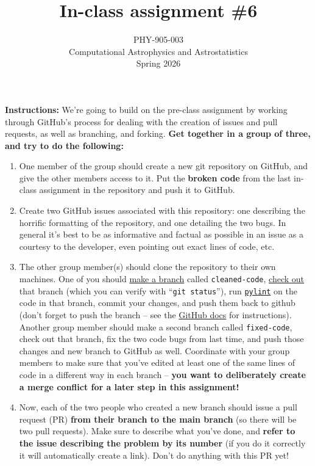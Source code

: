 \documentclass[10pt]{article}
\title{In-class assignment \#6}
\author{PHY-905-003\\Computational Astrophysics and
  Astrostatistics\\Spring 2026}
\date{} %
\begin{document}
 
\maketitle

\vspace{-5mm}


\noindent \textbf{Instructions:}  We're going to build on the
pre-class assignment by working through GitHub's process for dealing
with the creation of issues and pull requests, as well as branching,
and forking.  \textbf{Get together in a group of three, and try to do
  the following:}

\begin{enumerate}

\item One member of the group should create a new git repository on
  GitHub, and give the other members access to it.  Put the
  \textbf{broken code} from the last in-class assignment in the
  repository and push it to GitHub.

\item Create two GitHub issues associated with this repository: one describing the horrific formatting
  of the repository, and one detailing the two bugs.  In general it's
  best to be as informative and factual as possible in an issue as a
  courtesy to the developer, even pointing out exact lines of code, etc.
  
\item The other group member(s) should clone the repository to their
  own machines.  One of you should \href{https://git-scm.com/book/en/v2/Git-Branching-Basic-Branching-and-Merging}{make a branch} called
  \texttt{cleaned-code}, \href{https://git-scm.com/docs/git-checkout}{check out} that branch (which you can
  verify with ``\texttt{git status}''), run \href{https://www.pylint.org/}{\texttt{pylint}} on the code in that
  branch, commit your changes, and push them back to github (don't
  forget to push the branch -- see the
  \href{https://github.com/git-guides/git-push}{GitHub docs} for instructions).  Another
  group member should make a second branch called \texttt{fixed-code},
  check out that branch,
  fix the two code bugs from last time, and push those changes and new
  branch to
  GitHub as well.
  Coordinate with your group members to make sure that you've edited
  at least one of the same lines of code in a different way in each
  branch -- \textbf{you want to deliberately create a merge conflict
    for a later step in this assignment!}

\item Now, each of the two people who created a new branch should
  issue a pull request (PR) \textbf{from their branch to the main branch}
  (so there will be two pull requests).  Make sure to describe what
  you've done, and \textbf{refer to the issue describing the problem
    by its number} (if you do it correctly it will automatically
  create a link). Don't do anything with this PR 
  yet!


\end{enumerate}
\end{document}
